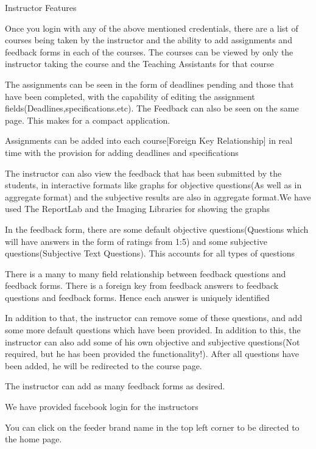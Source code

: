 \documentclass[11pt]{report}
\begin{document}
\begin{outline}
\begin{outline}
\newpage
    	\item Instructor Features
    	\begin{outline}
    	\item Once you login with any of the above mentioned credentials, there are a list of courses being taken by the instructor and the ability to add assignments and feedback forms in each of the courses. The courses can be viewed by only the instructor taking the course and the Teaching Assistants for that course
    	\item The assignments can be seen in the form of deadlines pending and those that have been completed, with the capability of editing the assignment fields(Deadlines,specifications.etc). The Feedback can also be seen on the same page. This makes for a compact application.
    	\item Assignments can be added into each course[Foreign Key Relationship] in real time with the provision for adding deadlines and specifications
		\item The instructor can also view the feedback that has been submitted by the students, in interactive formats like graphs for objective questions(As well as in aggregate format) and the subjective results are also in aggregate format.We have used The ReportLab and the Imaging Libraries for showing the graphs
		\item In the feedback form, there are some default objective questions(Questions which will have answers in the form of ratings from 1:5) and some subjective questions(Subjective Text Questions). This accounts for all types of questions
		\item There is a many to many field relationship between feedback questions and feedback forms. There is a foreign key from feedback answers to feedback questions and feedback forms. Hence each answer is uniquely identified
		\item In addition to that, the instructor can remove some of these questions, and add some more default questions which have been provided. In addition to this, the instructor can also add some of his own objective and subjective questions(Not required, but he has been provided the functionality!). After all questions have been added, he will be redirected to the course page.
		\item The instructor can add as many feedback forms as desired.
		\item We have provided facebook login for the instructors
		\item You can click on the feeder brand name in the top left corner to be directed to the home page.
\end{outline}


\end{outline}
\end{outline}
\end{document}
